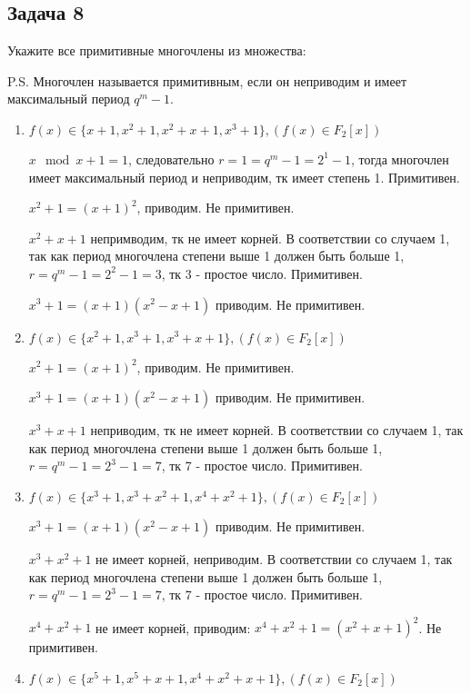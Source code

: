 \documentclass[12pt]{extarticle}
\begin{document}
\subsection{Задача 8}
Укажите все примитивные многочлены из множества:


P.S. Многочлен называется примитивным, если он неприводим и имеет максимальный период $q^m - 1$.

\begin{enumerate}
    \item $f(x)\in\{x+1, x^2+1, x^2+x+1, x^3+1\}, (f(x)\in F_2[x])$
    
    $x \mod x+1 = 1$, следовательно $ r = 1 = q^m -1 = 2^1 -1$, тогда многочлен имеет максимальный период и неприводим, тк имеет степень 1. Примитивен.
    
    $x^2 + 1 = (x+1)^2$, приводим. Не примитивен.
    
    $ x^2+x+1$ непримводим, тк не имеет корней. В соответствии со случаем 1, так как период многочлена степени выше 1 должен быть больше 1, $r = q^m -1 = 2^2 - 1 = 3$, тк 3 - простое число. Примитивен.
    
    $x^3 + 1 = (x+1)(x^2 - x + 1)$ приводим. Не примитивен.

    \item $f(x)\in\{x^2+1, x^3+1, x^3+x+1\}, (f(x)\in F_2[x])$
    
    $x^2 + 1 = (x+1)^2$, приводим. Не примитивен.
    
    $x^3 + 1 = (x+1)(x^2 - x + 1)$ приводим. Не примитивен.
    
    $x^3+x+1$ неприводим, тк не имеет корней. В соответствии со случаем 1, так как период многочлена степени выше 1 должен быть больше 1, $r = q^m -1 = 2^3 - 1 = 7$, тк 7 - простое число. Примитивен.

    \item $f(x)\in\{x^3+1, x^3+x^2+1, x^4+x^2+1\}, (f(x)\in F_2[x])$
    
    $x^3 + 1 = (x+1)(x^2 - x + 1)$ приводим. Не примитивен.
    
    $x^3+x^2+1$ не имеет корней, неприводим. В соответствии со случаем 1, так как период многочлена степени выше 1 должен быть больше 1, $r = q^m -1 = 2^3 - 1 = 7$, тк 7 - простое число. Примитивен.
    
    $ x^4+x^2+1$ не имеет корней, приводим: $ x^4+x^2+1 = (x^2+x+1)^2$. Не примитивен.

    \item $f(x)\in\{x^5+1, x^5+x+1, x^4+x^2+x+1\}, (f(x)\in F_2[x])$
    

\end{enumerate}
\end{document}
